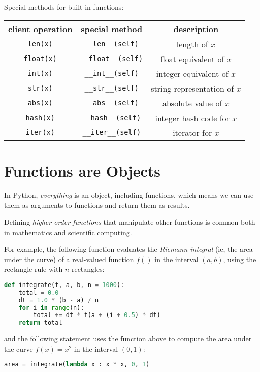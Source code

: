 \documentclass[8pt,a4paper,compress,handout]{beamer}
\begin{document}
\begin{frame}[fragile]
Special methods for built-in functions:
\begin{center}
\begin{tabular}{ccc}
client operation & special method & description \\ \hline
\lstinline$len(x)$ & \lstinline$__len__(self)$ & length of $x$ \\
\lstinline$float(x)$ & \lstinline$__float__(self)$ & float equivalent of $x$ \\
\lstinline$int(x)$ & \lstinline$__int__(self)$ & integer equivalent of $x$ \\
\lstinline$str(x)$ & \lstinline$__str__(self)$ & string representation of $x$ \\
\lstinline$abs(x)$ & \lstinline$__abs__(self)$ & absolute value of $x$ \\
\lstinline$hash(x)$ & \lstinline$__hash__(self)$ & integer hash code for $x$ \\
\lstinline$iter(x)$ & \lstinline$__iter__(self)$ & iterator for $x$
\end{tabular} 
\end{center}
\end{frame}

\section{Functions are Objects}
\begin{frame}[fragile]
In Python, \emph{everything} is an object, including functions, which means we can use them as arguments to functions and return them as results.

\bigskip

Defining \emph{higher-order functions} that manipulate other functions is common both in mathematics and scientific computing.

\bigskip

For example, the following function evaluates the \emph{Riemann integral} (ie, the area under the curve) of a real-valued function $f()$ in the interval $(a, b)$, using the rectangle rule with $n$ rectangles:

\begin{lstlisting}[language=Python]
def integrate(f, a, b, n = 1000):
    total = 0.0
    dt = 1.0 * (b - a) / n
    for i in range(n):
        total += dt * f(a + (i + 0.5) * dt)
    return total
\end{lstlisting}

and the following statement uses the function above to compute the area under the curve $f(x)=x^2$ in the interval $(0, 1)$:

\begin{lstlisting}[language=Python]
area = integrate(lambda x : x * x, 0, 1)
\end{lstlisting}
\end{frame}
\end{document}
